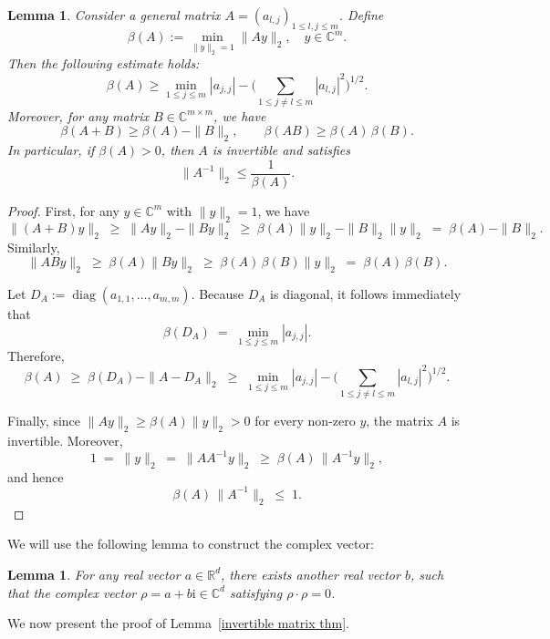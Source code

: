 \documentclass[12pt]{amsart}
\newtheorem{lem}[thm]{Lemma}
\begin{document}
\begin{lem}\label{lowerbound}
    Consider a general matrix $A = (a_{l,j})_{1 \leq l, j \leq m}$. Define
    \[
    \beta(A) := \min_{\|y\|_2 = 1} \|A y\|_2, \quad y \in \mathbb{C}^m.
    \]
    Then the following estimate holds:
    \begin{equation*}
       \beta(A) \geq \min_{1 \leq j \leq m} |a_{j,j}| - \Bigg( \sum_{1 \leq j \neq l \leq m} |a_{l,j}|^2 \Bigg)^{1/2}.
    \end{equation*}
    Moreover, for any matrix $B \in \mathbb{C}^{m \times m}$, we have
    \begin{equation*}
        \beta(A + B) \geq \beta(A) - \|B\|_2, \qquad \beta(AB) \geq \beta(A)\, \beta(B).
    \end{equation*}
    In particular, if $\beta(A) > 0$, then $A$ is invertible and satisfies
    \begin{equation*}
        \|A^{-1}\|_2 \leq \frac{1}{\beta(A)}.
    \end{equation*}
\end{lem}


\begin{proof}
    First, for any $y \in \mathbb{C}^{m}$ with $\|y\|_2 = 1$, we have
\[
\|(A+B)y\|_2 
    \;\ge\; \|Ay\|_2 - \|By\|_2
    \;\ge\; \beta(A)\|y\|_2 - \|B\|_2\|y\|_2
    \;=\; \beta(A) - \|B\|_2.
\]
Similarly,
\[
\|ABy\|_2 
    \;\ge\; \beta(A)\|By\|_2 
    \;\ge\; \beta(A)\,\beta(B)\|y\|_2
    \;=\; \beta(A)\,\beta(B).
\]

Let $D_A := \operatorname{diag}(a_{1,1}, \dots, a_{m,m})$.  
Because $D_A$ is diagonal, it follows immediately that
\[
\beta(D_A) \;=\; \min_{1 \le j \le m} |a_{j,j}|.
\]
Therefore,
\[
\beta(A)
    \;\ge\; \beta(D_A) - \|A - D_A\|_2
    \;\ge\; \min_{1 \le j \le m} |a_{j,j}|
           - \Bigg(\sum_{1 \le j \neq l \le m} |a_{l,j}|^{2}\Bigg)^{1/2}.
\]

Finally, since $\|Ay\|_2 \ge \beta(A)\|y\|_2 > 0$ for every non-zero $y$, the matrix $A$ is invertible. Moreover,
\[
1 \;=\; \|y\|_2 
    \;=\; \|A A^{-1} y\|_2 
    \;\ge\; \beta(A)\, \|A^{-1}y\|_2,
\]
and hence
\[
\beta(A)\,\|A^{-1}\|_2 \;\le\; 1.
\]

\end{proof}
We will use the following lemma to construct the complex vector:
\begin{lem}\label{lemma:vectorb}
   For any real vector $a\in \mathbb{R}^d$, there exists another real vector $b$, such that the complex vector $\rho =a+b\mathrm{i} \in \mathbb{C}^d$ satisfying $\rho \cdot \rho=0$.
\end{lem}
We now present the proof of Lemma~\ref{invertible matrix thm}.
\end{document}
